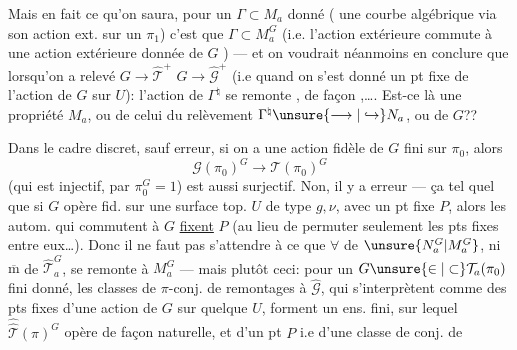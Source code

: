 Mais en fait ce qu'on saura, pour un $\Gamma\subset M_a$ donné ( une courbe algébrique via son action ext. sur un $\pi_1$) c'est que $\Gamma\subset M_a^G$ (i.e. l'action extérieure commute à une action extérieure donnée de $G$ ) --- et on voudrait néanmoins en conclure que lorsqu'on a relevé $G\longrightarrow\widehat{\mathcal T}^{+}$  $G\longrightarrow\widehat{\mathcal G}^{+}$ (i.e quand on s'est donné un pt fixe de l'action de $G$ sur $U$):  l'action de $\Gamma^{\natural}$ se remonte  ,  de façon  ,\ldots . Est-ce là une propriété  $M_a$, ou de celui du relèvement $\Gamma^{\natural}\unsure{\longrightarrow|\hookrightarrow}N_a$, ou de $G$??


Dans le cadre discret, sauf erreur, si on a une action fidèle  de $G$ fini sur $\pi_0$, alors 
\[
\mathcal G(\pi_0)^G\longrightarrow\mathcal T(\pi_0)^G
\]
(qui est injectif, par $\pi_0^G=1$) est aussi surjectif. Non, il y a erreur --- ça  tel quel que si $G$ opère fid. sur une surface top. $U$ de type $g,\nu$, avec un pt fixe $P$, alors les autom. qui commutent à $G$ \uline{fixent} $P$ (au lieu de permuter seulement les pts fixes entre eux\ldots). Donc il ne faut pas s'attendre à ce que $\forall$  de $\unsure{N_a^G|M_a^G}$, ni $\overline{\mathrm m}$ de $\widehat{\mathcal T}_a^G$, se remonte à $M_a^G$ --- mais plutôt ceci: pour un $G\unsure{\in|\subset}\mathcal T_a(\pi_0)$  fini donné, les classes de $\pi$-conj. de remontages à $\widehat{\mathcal G}$,  qui s'interprètent comme des pts fixes d'une action de $G$ sur quelque $U$, forment un ens. fini, sur lequel $\widehat{\widehat{\mathcal T}}(\pi)^G$ opère de façon naturelle, et   d'un pt $P$ i.e d'une classe de conj. de 
